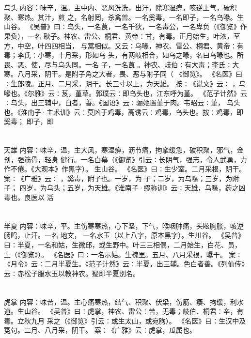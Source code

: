 \documentclass[12pt,UTF8]{ctexbook}
\begin{document}
\section{}乌头
内容：味辛，温。主中内、恶风洗洗，出汗，除寒湿痹，咳逆上气，破积聚、寒热。其汁，煎 
之，名射罔，杀禽兽。一名奚毒，一名即子，一名乌喙。生山谷。 
《吴普》曰∶乌头，一名莨，一名千狄，一名毒公，一名卑负（《御览》作果负），一名 
耿子。神农、雷公、桐君、黄帝∶甘，有毒。正月始生，叶浓，茎方，中空，叶四四相当， 
与蒿相似。又云∶乌喙，神农、雷公、桐君、黄帝∶有毒；李氏∶小寒，十月采，形如乌 
头，有两岐相合，如乌之喙，名曰乌喙也。所畏、恶、使，尽与乌头同。一名 子，一名莨 
。神农、岐伯∶有大毒；李氏∶大寒。八月采，阴干。是附子角之大者，畏、恶与附子同（ 
《御览》。 
《名医》曰∶生郎陵。正月、二月采，阴干。长三寸以上，为天雄。 
按∶《说文》云∶ ，乌喙也。《尔雅》云∶芨，堇草。郭璞云∶即乌头也，江东呼为堇。 
《范子计然》云∶乌头，出三辅中，白者，善。《国语》云∶骊姬置堇于肉。韦昭云∶堇， 
乌头也。《淮南子·主术训》云∶莫凶于鸡毒，高诱云∶鸡毒，乌头也。按∶鸡毒，即奚毒； 
即子，即 


\section{}天雄
内容：味辛，温，主大风，寒湿痹，沥节痛，拘挛缓急，破积聚，邪气，金创，强筋骨，轻身 
健行。一名白幕（《御览》引云∶长阴气，强志，令人武勇，力作不倦。《大观本》作黑字）。 
生山谷。 
《名医》曰∶生少室。二月采根，阴干。 
案∶《广雅》云∶ ，奚毒，附子也。一岁，为 子；二岁，为乌喙；三岁，为附子； 
四岁，为乌头；五岁，为天雄。《淮南子·缪称训》云∶天雄，乌喙，药之凶毒也。良医以 
活 


\section{}半夏
内容：味辛，平。主伤寒寒热，心下坚，下气，喉咽肿痛，头眩胸胀，咳逆肠鸣，止汗。一名 
地文， 
一名水玉（以上八字，原本黑字）。生川谷。 
《吴普》曰∶半夏，一名和姑，生微邱，或生野中。叶三三相偶，二月始生，白花、员， 
上（《御览》）。 
《名医》曰∶一名示姑。生槐里。五月、八月采根，曝干。 
案∶《月令》云∶二月半夏生。《范子计然》云∶半夏，出三辅。色白者善。《列仙传》 
云∶赤松子服水玉以教神农。疑即半夏别名。 


\section{}虎掌
内容：味苦，温。主心痛寒热，结气、积聚、伏梁，伤筋、痿、拘缓，利水道。生山谷。 
《吴普》曰∶虎掌，神农、雷公∶苦，无毒；岐伯、桐君∶辛，有毒。立秋九月 
采之（《御览》引云∶或生太山，或宛朐）。 
《名医》曰∶生汉中及冤句。二月、八月采，阴干。 
案∶《广雅》云∶虎掌，瓜属也。 
\end{document}
